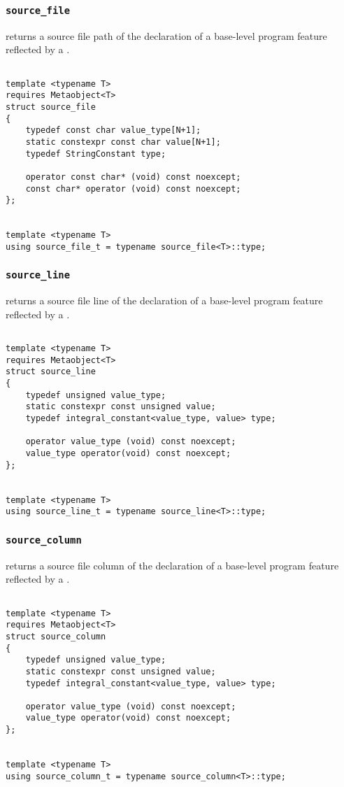 
\subsubsection{\texttt{source\_file}}

returns a source file path of the declaration of a base-level program feature reflected by a .

\begin{verbatim}

template <typename T>
requires Metaobject<T>
struct source_file
{
	typedef const char value_type[N+1];
	static constexpr const char value[N+1];
	typedef StringConstant type;

	operator const char* (void) const noexcept;
	const char* operator (void) const noexcept;
};


template <typename T>
using source_file_t = typename source_file<T>::type;

\end{verbatim}

\subsubsection{\texttt{source\_line}}

returns a source file line of the declaration of a base-level program feature reflected by a .

\begin{verbatim}

template <typename T>
requires Metaobject<T>
struct source_line
{
	typedef unsigned value_type;
	static constexpr const unsigned value;
	typedef integral_constant<value_type, value> type;

	operator value_type (void) const noexcept;
	value_type operator(void) const noexcept;
};


template <typename T>
using source_line_t = typename source_line<T>::type;

\end{verbatim}

\subsubsection{\texttt{source\_column}}

returns a source file column of the declaration of a base-level program feature reflected by a .

\begin{verbatim}

template <typename T>
requires Metaobject<T>
struct source_column
{
	typedef unsigned value_type;
	static constexpr const unsigned value;
	typedef integral_constant<value_type, value> type;

	operator value_type (void) const noexcept;
	value_type operator(void) const noexcept;
};


template <typename T>
using source_column_t = typename source_column<T>::type;

\end{verbatim}
